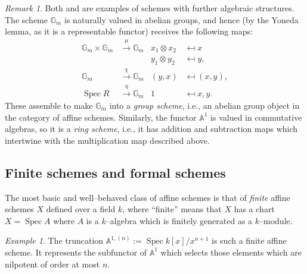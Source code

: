 \documentclass{amsart}
\newcommand{\<}{\langle}
\renewcommand{\>}{\rangle}
\DeclareMathOperator{\Spec}{Spec}
\theoremstyle{plain}
\theoremstyle{definition}
\theoremstyle{remark}
\newtheorem*{remark}{Remark}
\newtheorem*{example}{Example}
\begin{document}
\begin{remark}
Both  and  are examples of schemes with further algebraic structures.  The scheme $\mathbb G_m$ is naturally valued in abelian groups, and hence (by the Yoneda lemma, as it is a representable functor) receives the following maps:
\begin{align*}
\mathbb G_m \times \mathbb G_m & \xrightarrow{\mu} \mathbb G_m & x_1 \otimes x_2 & \mapsfrom x \\
& & y_1 \otimes y_2 & \mapsfrom y, \\
\mathbb G_m & \xrightarrow{\chi} \mathbb G_m & (y, x) & \mapsfrom (x, y), \\
\Spec R & \xrightarrow{\eta} \mathbb G_m & 1 & \mapsfrom x, y.
\end{align*}
These assemble to make $\mathbb G_m$ into a \textit{group scheme}, i.e., an abelian group object in the category of affine schemes.  Similarly, the functor $\mathbb A^1$ is valued in commutative algebras, so it is a \textit{ring scheme}, i.e., it has addition and subtraction maps which intertwine with the multiplication map described above.
\end{remark}

\subsection{Finite schemes and formal schemes}

The most basic and well--behaved class of affine schemes is that of \textit{finite} affine schemes $X$ defined over a field $k$, where ``finite'' means that $X$ has a chart $X = \Spec A$ where $A$ is a $k$--algebra which is finitely generated as a $k$--module.
\begin{example}\label{DefnA1n}
The truncation $\mathbb A^{1, (n)} := \Spec k[x] / x^{n+1}$ is such a finite affine scheme.  It represents the subfunctor of $\mathbb A^1$ which selects those elements which are nilpotent of order at most $n$.
\end{example}
\end{document}
